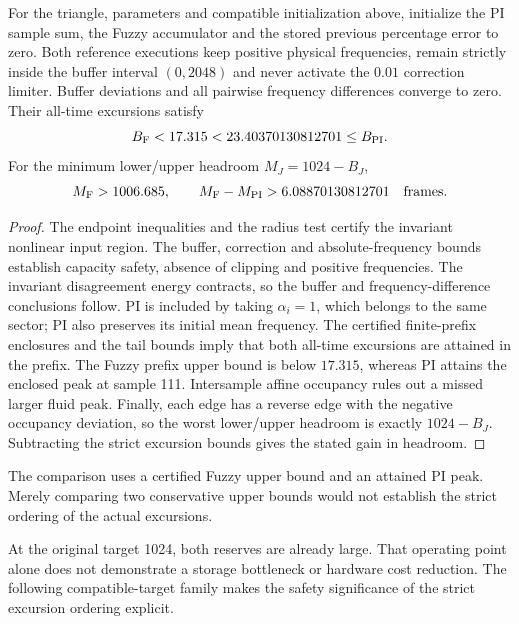 \begin{btdtheorem}
\label{detail:thm:btd_headroom}
For the triangle, parameters and compatible initialization above,
initialize the PI sample sum, the Fuzzy accumulator and the stored
previous percentage error to zero. Both reference executions keep
positive physical frequencies, remain strictly inside the buffer
interval $(0,2048)$ and never activate the $0.01$ correction limiter.
Buffer deviations and all pairwise frequency differences converge to
zero. Their all-time excursions satisfy
\begin{equation}
 B_{\rm F}<17.315<23.40370130812701\le B_{\rm PI}.
 \label{detail:eq:btd_strict_comparison}
\end{equation}
For the minimum lower/upper headroom $M_J=1024-B_J$,
\begin{equation}
 M_{\rm F}>1006.685,\qquad
 M_{\rm F}-M_{\rm PI}>6.08870130812701\quad\text{frames}.
 \label{detail:eq:btd_margin_improvement}
\end{equation}
\end{btdtheorem}
\begin{proof}
The endpoint inequalities and the radius test certify the invariant
nonlinear input region. The buffer, correction and absolute-frequency
bounds establish capacity safety, absence of clipping and positive
frequencies. The invariant disagreement energy contracts, so the buffer
and frequency-difference conclusions follow. PI is included by taking
$\alpha_i=1$, which belongs to the same sector; PI also preserves its
initial mean frequency. The certified finite-prefix enclosures and the
tail bounds imply that both all-time excursions are attained in the
prefix. The Fuzzy prefix upper bound is below $17.315$, whereas PI
attains the enclosed peak at sample 111. Intersample affine occupancy
rules out a missed larger fluid peak. Finally, each edge has a reverse
edge with the negative occupancy deviation, so the worst lower/upper
headroom is exactly $1024-B_J$. Subtracting the strict excursion bounds
gives the stated gain in headroom.
\end{proof}

The comparison uses a certified Fuzzy upper bound and an attained PI
peak. Merely comparing two conservative upper bounds would not establish
the strict ordering of the actual excursions.

At the original target 1024, both reserves are already large. That
operating point alone does not demonstrate a storage bottleneck or
hardware cost reduction. The following compatible-target family makes
the safety significance of the strict excursion ordering explicit.

